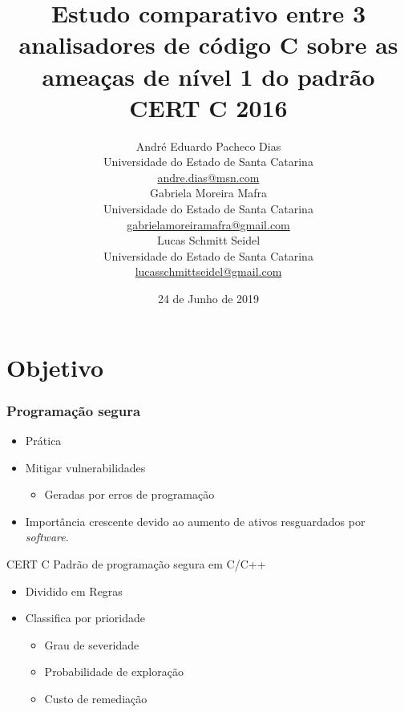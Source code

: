 \documentclass{beamer}
\title[Analisadores de código para o padrão CERT C]{Estudo comparativo entre 3 analisadores de código C sobre as
ameaças de nível 1 do padrão CERT C 2016}
\author[André, Gabriela, Lucas]{
    André Eduardo Pacheco Dias\smallskip \leavevmode \\
    {\scriptsize Universidade do Estado de Santa Catarina \\\smallskip
    \url{andre.dias@msn.com}  \\}
    \medskip
    Gabriela Moreira Mafra\\\smallskip
    {\scriptsize Universidade do Estado de Santa Catarina \\\smallskip
    \url{gabrielamoreiramafra@gmail.com}  \\ }
    \medskip
    Lucas Schmitt Seidel\\\smallskip
    {\scriptsize Universidade do Estado de Santa Catarina \\\smallskip\vspace{-2mm}
    \url{lucasschmittseidel@gmail.com}}
    \vspace{-7mm}
}
\begin{document}
  \date{24 de Junho de 2019}
  \begin{frame}
      \titlepage
  \end{frame}

\tableofcontents

\section{Objetivo}

\begin{frame}
  \frametitle{Programação segura}

  \begin{itemize}
    \item Prática
    \item Mitigar vulnerabilidades
    \begin{itemize}
      \item Geradas por erros de programação
    \end{itemize}
    \item Importância crescente devido ao aumento de ativos resguardados por \textit{software}.
  \end{itemize}\pause

  \begin{block}{CERT C}
    Padrão de programação segura em C/C++
    \begin{itemize}
      \item Dividido em Regras
      \item Classifica por prioridade
      \begin{itemize}
        \item Grau de severidade
        \item Probabilidade de exploração
        \item Custo de remediação
      \end{itemize}
    \end{itemize}
 \end{block}

\end{frame}
\end{document}
